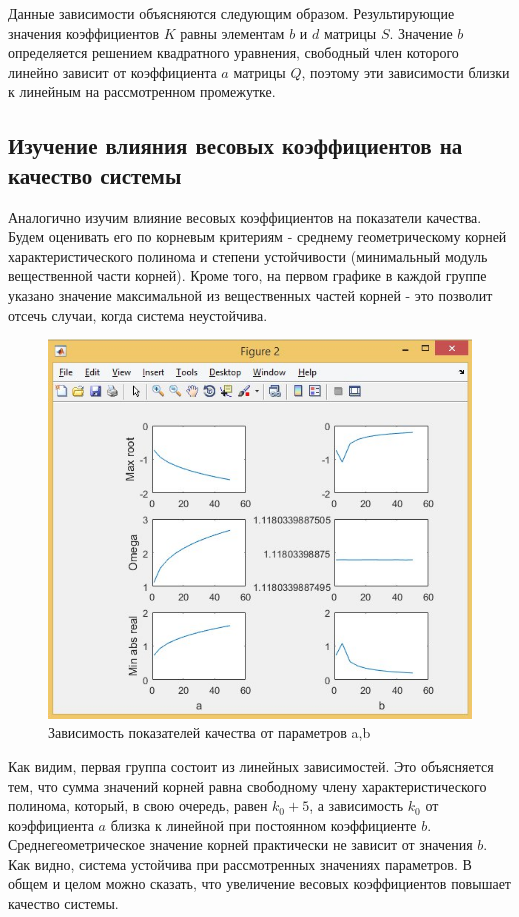 \documentclass[14pt,a4paper,report]{report}
\begin{document}
Данные зависимости объясняются следующим образом. Результирующие значения коэффициентов $K$ равны элементам $b$ и $d$ матрицы $S$. Значение $b$ определяется решением квадратного уравнения, свободный член которого линейно зависит от коэффициента $a$ матрицы $Q$, поэтому эти зависимости близки к линейным на рассмотренном промежутке. 

\subsection{Изучение влияния весовых коэффициентов на качество системы}

Аналогично изучим влияние весовых коэффициентов на показатели качества. Будем оценивать его по корневым критериям - среднему геометрическому корней характеристического полинома и степени устойчивости (минимальный модуль вещественной части корней). Кроме того, на первом графике в каждой группе указано значение максимальной из вещественных частей корней - это позволит отсечь случаи, когда система неустойчива.

\begin{figure}[h!]
	\centering
	\includegraphics[scale = 0.55]{images/regs.png}
	\caption{Зависимость показателей качества от параметров a,b}
	\label{image:4}
\end{figure}
\FloatBarrier

Как видим, первая группа состоит из линейных зависимостей. Это объясняется тем, что сумма значений корней равна свободному члену характеристического полинома, который, в свою очередь, равен $k_0+5$, а зависимость $k_0$ от коэффициента $a$ близка к линейной при постоянном коэффициенте $b$. Среднегеометрическое значение корней практически не зависит от значения $b$. Как видно, система устойчива при рассмотренных значениях параметров. В общем и целом можно сказать, что увеличение весовых коэффициентов повышает качество системы. 
\end{document}

